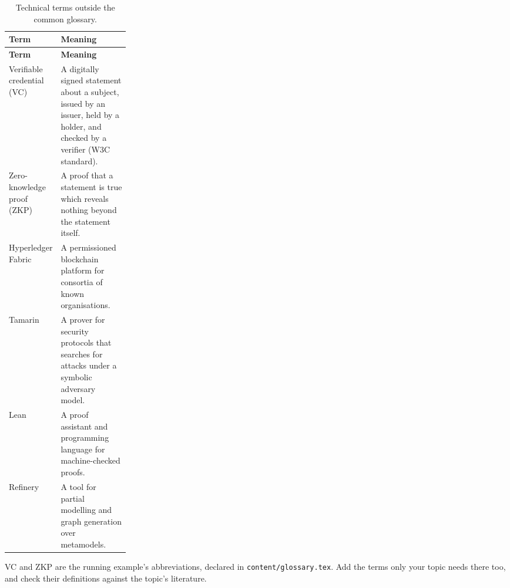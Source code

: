 {\small
\begin{xltabular}{\linewidth}{>{\raggedright\arraybackslash}p{0.24\linewidth} X}
  \caption{Technical terms outside the common glossary.}\label{guide:tab:glossary-technical}\\
  \toprule \textbf{Term} & \textbf{Meaning} \\ \midrule \endfirsthead
  \toprule \textbf{Term} & \textbf{Meaning} \\ \midrule \endhead
  \bottomrule \endlastfoot
  Verifiable credential (VC) & A digitally signed statement about a subject, issued by an issuer, held by a holder, and checked by a verifier (W3C standard). \\
  Zero-knowledge proof (ZKP) & A proof that a statement is true which reveals nothing beyond the statement itself. \\
  Hyperledger Fabric & A permissioned blockchain platform for consortia of known organisations. \\
  Tamarin & A prover for security protocols that searches for attacks under a symbolic adversary model. \\
  Lean & A proof assistant and programming language for machine-checked proofs. \\
  Refinery & A tool for partial modelling and graph generation over metamodels. \\
\end{xltabular}
}
VC and ZKP are the running example's abbreviations, declared in \texttt{content/glossary.tex}. Add the terms only your topic needs there too, and check their definitions against the topic's literature.

